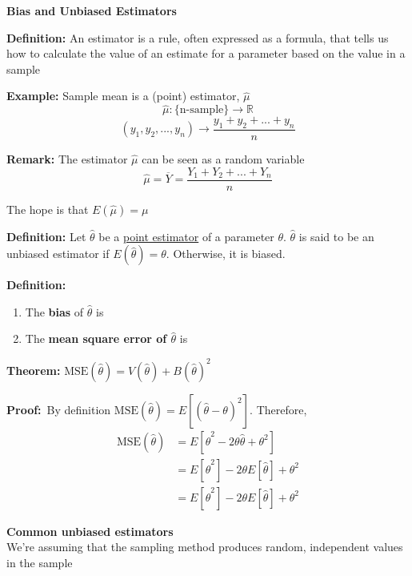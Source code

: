 \documentclass[12pt, letterpaper]{article}
\begin{document}
\textbf{Bias and Unbiased Estimators}

\textbf{Definition:} An estimator is a rule, often expressed as a formula, that tells us how to calculate the value of an estimate for a parameter based on the value in a sample

\textbf{Example: }Sample mean is a (point) estimator, $\hat{\mu}$
$$\hat{\mu}: \{\text{n-sample}\} \rightarrow \mathbb{R}$$
$$(y_1, y_2, ..., y_n) \rightarrow \frac{y_1 + y_2 + ... +y_n}{n}$$

\textbf{Remark:} The estimator $\hat{\mu}$ can be seen as a random variable
$$\hat{\mu}=\overline{Y}=\frac{Y_1 + Y_2 + ... + Y_n}{n}$$

The hope is that $E(\hat{\mu})=\mu$ \bigskip

\textbf{Definition:} Let $\hat{\theta}$ be a \underline{point estimator} of a parameter $\theta$. $\hat{\theta}$ is said to be an unbiased estimator if $E(\hat{\theta})=\theta$. Otherwise, it is biased. \bigskip

\textbf{Definition:} 
\begin{enumerate}
    \item The \textbf{bias} of $\hat{\theta}$ is 
    \item The \textbf{mean square error of $\hat{\theta}$} is 
\end{enumerate}
\bigskip
\textbf{Theorem:} $\text{MSE}(\hat{\theta}) = V(\hat{\theta}) + B(\hat{\theta})^2$ \bigskip

\textbf{Proof:}\
By definition $\text{MSE}(\hat{\theta})=E[(\hat{\theta}-\theta)^2]$. Therefore,
\begin{align*}
    \text{MSE}(\hat{\theta})&=E[\hat{\theta}^2-2\theta\hat{\theta}+\theta^2] \\
    &=E[\hat{\theta}^2]-2\theta E[\hat{\theta}] + \theta^2 \\
    &=E[\hat{\theta}^2]-2\theta E[\hat{\theta}] + \theta^2    
\end{align*}





\textbf{Common unbiased estimators}\\
We're assuming that the sampling method produces random, independent values in the sample
\end{document}
